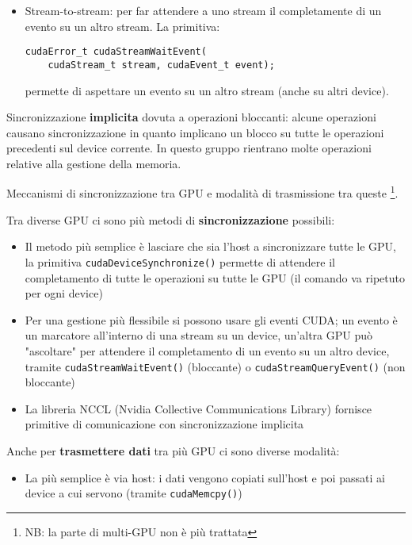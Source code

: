 \begin{questions}
\begin{solution}
\begin{itemize}
            \item Stream-to-stream: per far attendere a uno stream il completamente di un evento su un altro stream. La primitiva:
            \begin{verbatim}
cudaError_t cudaStreamWaitEvent(
    cudaStream_t stream, cudaEvent_t event);
            \end{verbatim}
            permette di aspettare un evento su un altro stream (anche su altri device).
        \end{itemize}
        
        Sincronizzazione \textbf{implicita} dovuta a operazioni bloccanti: alcune operazioni causano sincronizzazione in quanto implicano un blocco su tutte le operazioni precedenti sul device corrente. In questo gruppo rientrano molte operazioni relative alla gestione della memoria.
    \end{solution}
    
    \question Meccanismi di sincronizzazione tra GPU e modalità di trasmissione tra queste \footnote{NB: la parte di multi-GPU non è più trattata}.
    
    \begin{solution}
        Tra diverse GPU ci sono più metodi di \textbf{sincronizzazione} possibili: 
        \begin{itemize}
            \item Il metodo più semplice è lasciare che sia l'host a sincronizzare tutte le GPU, la primitiva \texttt{cudaDeviceSynchronize()} permette di attendere il completamento di tutte le operazioni su tutte le GPU (il comando va ripetuto per ogni device)
            
            \item Per una gestione più flessibile si possono usare gli eventi CUDA; un evento è un marcatore all'interno di una stream su un device, un'altra GPU può "ascoltare" per attendere il completamento di un evento su un altro device, tramite \texttt{cudaStreamWaitEvent()} (bloccante) o \texttt{cudaStreamQueryEvent()} (non bloccante)
            
            \item La libreria NCCL (Nvidia Collective Communications Library) fornisce primitive di comunicazione con sincronizzazione implicita
        \end{itemize}
        
        Anche per \textbf{trasmettere dati} tra più GPU ci sono diverse modalità:
        \begin{itemize}
            \item La più semplice è via host: i dati vengono copiati sull'host e poi passati ai device a cui servono (tramite \texttt{cudaMemcpy()})
            

\end{itemize}
\end{solution}
\end{questions}
